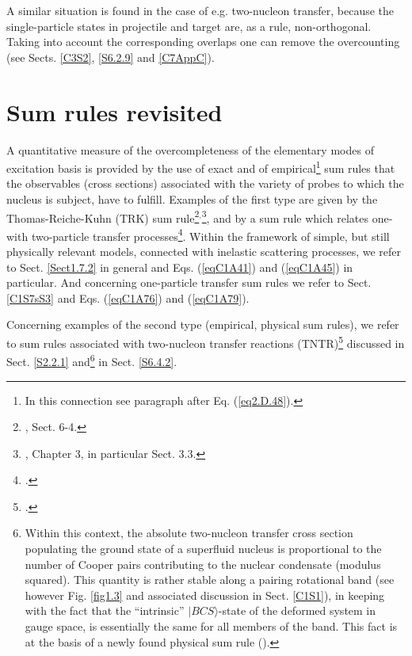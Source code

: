 A similar situation is found in the case of e.g. two-nucleon transfer, because the single-particle states in projectile and target are, as a rule, non-orthogonal. Taking into account the corresponding  overlaps one can remove the overcounting (see Sects. \ref{C3S2}, \ref{S6.2.9} and  \ref{C7AppC}).


\section{Sum rules revisited}\label{C1S2}
A quantitative measure of the overcompleteness of  the elementary modes of excitation basis is provided by the use of exact and of empirical\footnote{In this connection see paragraph after Eq. (\ref{eq2.D.48}).}  sum rules that the observables (cross sections) associated with the variety of probes to which the nucleus is subject, have to fulfill. Examples of the first type are given by the Thomas-Reiche-Kuhn (TRK) sum rule\footnote{\cite{Bohr:75}, Sect. 6-4.}$^,$\footnote{\cite{Bertsch:05}, Chapter 3, in particular Sect. 3.3.}, and by a sum rule which relates one- with two-particle transfer processes\footnote{\cite{Bayman:72,Lanford:77}.}. Within the framework of simple, but still physically relevant models, connected with inelastic scattering processes, we refer to Sect. \ref{Sect1.7.2} in general and Eqs.  (\ref{eqC1A41}) and (\ref{eqC1A45}) in particular. And concerning one-particle transfer sum rules we refer to Sect. \ref{C1S7sS3} and Eqs. (\ref{eqC1A76}) and (\ref{eqC1A79}).


 Concerning examples of the second type (empirical, physical sum rules), we refer to sum rules associated with two-nucleon transfer reactions (TNTR)\footnote{\cite{Broglia:72b}.} discussed in Sect. \ref{S2.2.1} and\footnote{Within this context, the absolute two-nucleon transfer cross section populating the ground state of a superfluid nucleus is proportional to the number of Cooper pairs contributing to the nuclear condensate (modulus squared). This quantity is rather stable along a pairing rotational band (see however Fig. \ref{fig1.3} and associated discussion in Sect. \ref{C1S1}), in keeping with the fact that the ``intrinsic'' $|BCS\rangle$-state of the deformed system in gauge space, is essentially the same for all members of the band. This fact is at the basis of a newly found physical sum rule \mbox{(\cite{Potel:17})}.} in Sect. \ref{S6.4.2}.












